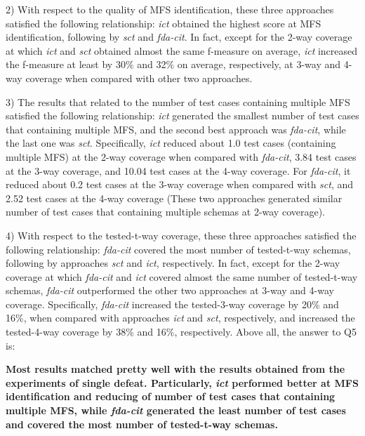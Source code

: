 \documentclass[10pt,journal,compsoc]{IEEEtran}
\begin{document}
{2) With respect to the quality of MFS identification, these three approaches satisfied the following relationship: \emph{ict} obtained the highest score at MFS identification, following by \emph{sct} and \emph{fda-cit}. In fact, except for the 2-way coverage at which \emph{ict} and \emph{sct} obtained almost the same f-measure on average, \emph{ict} increased the f-measure at least by 30\% and 32\% on average, respectively, at 3-way and 4-way coverage when compared with other two approaches.


3) The results that related to the number of test cases containing multiple MFS satisfied the following relationship:  \emph{ict} generated the smallest number of test cases that containing multiple MFS, and the second best approach was \emph{fda-cit}, while the last one was \emph{sct}. Specifically, \emph{ict} reduced about 1.0 test cases (containing multiple MFS) at the 2-way coverage when compared with \emph{fda-cit}, 3.84 test cases at the 3-way coverage, and 10.04 test cases at the 4-way coverage. For \emph{fda-cit}, it reduced about 0.2 test cases at the 3-way coverage when compared with \emph{sct}, and 2.52 test cases at the 4-way coverage (These two approaches generated similar number of test cases that containing multiple schemas at 2-way coverage).


4) With respect to the tested-t-way coverage, these three approaches satisfied the following relationship: \emph{fda-cit} covered the most number of tested-t-way schemas, following by approaches \emph{sct} and \emph{ict}, respectively. In fact, except for the 2-way coverage at which \emph{fda-cit} and \emph{ict} covered almost the same number of tested-t-way schemas, \emph{fda-cit} outperformed the other two approaches at 3-way and 4-way coverage.  Specifically, \emph{fda-cit} increased the tested-3-way coverage by 20\% and 16\%, when compared with approaches \emph{ict} and \emph{sct}, respectively, and increased the tested-4-way coverage by 38\% and 16\%, respectively.
Above all, the answer to Q5 is:

\textbf{Most results matched pretty well with the results obtained from the experiments of single defeat. Particularly, \emph{ict} performed better at MFS identification and reducing of number of test cases that containing multiple MFS, while \emph{fda-cit} generated the least number of test cases and covered the most number of tested-t-way schemas.
}
}
\end{document}
